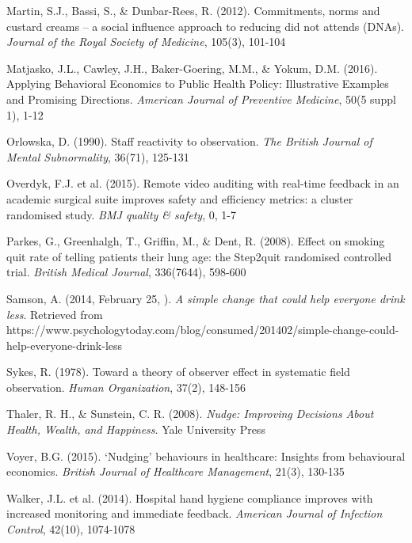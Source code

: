 \documentclass[]{article}
\begin{document}
Martin, S.J., Bassi, S., \& Dunbar-Rees, R. (2012). Commitments, norms
and custard creams -- a social influence approach to reducing did not
attends (DNAs). \emph{Journal of the Royal Society of Medicine}, 105(3),
101-104

Matjasko, J.L., Cawley, J.H., Baker-Goering, M.M., \& Yokum, D.M.
(2016). Applying Behavioral Economics to Public Health Policy:
Illustrative Examples and Promising Directions. \emph{American Journal
of Preventive Medicine}, 50(5 suppl 1), 1-12

Orlowska, D. (1990). Staff reactivity to observation. \emph{The British
Journal of Mental Subnormality}, 36(71), 125-131

Overdyk, F.J. et al. (2015). Remote video auditing with real-time
feedback in an academic surgical suite improves safety and efficiency
metrics: a cluster randomised study. \emph{BMJ quality \& safety}, 0,
1-7

Parkes, G., Greenhalgh, T., Griffin, M., \& Dent, R. (2008). Effect on
smoking quit rate of telling patients their lung age: the Step2quit
randomised controlled trial. \emph{British Medical Journal}, 336(7644),
598-600

Samson, A. (2014, February 25, ). \emph{A simple change that could help
everyone drink less}. Retrieved from
https://www.psychologytoday.com/blog/consumed/201402/simple-change-could-help-everyone-drink-less

Sykes, R. (1978). Toward a theory of observer effect in systematic field
observation. \emph{Human Organization}, 37(2), 148-156

Thaler, R. H., \& Sunstein, C. R. (2008). \emph{Nudge: Improving
Decisions About Health, Wealth, and Happiness}. Yale University Press

Voyer, B.G. (2015). `Nudging' behaviours in healthcare: Insights from
behavioural economics. \emph{British Journal of Healthcare Management},
21(3), 130-135

Walker, J.L. et al. (2014). Hospital hand hygiene compliance improves
with increased monitoring and immediate feedback. \emph{American Journal
of Infection Control}, 42(10), 1074-1078
\end{document}
